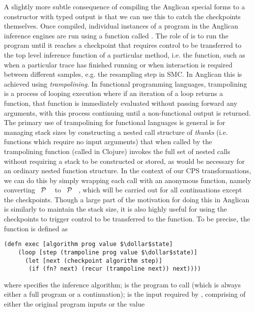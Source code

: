 A slightly more subtle consequence of compiling the Anglican special forms to a constructor with typed output is that
we can use this to catch the checkpoints themselves.  Once compiled, individual instances of
a program in the Anglican inference engines are run using a function called .  The role of
 is to run the program until it reaches a checkpoint that requires control to be transferred
to the top level inference function of a particular method, i.e. the \anginfer function, such as when
a particular trace has finished running or when interaction is required between different samples, e.g. 
the resampling step in SMC.  In Anglican this is achieved using \emph{trampolining}.  In functional
programming languages, trampolining is a process of looping execution where if an iteration of
a loop returns a function, that function is immediately evaluated without passing forward any arguments,
with this process continuing until a non-functional output is returned.  The primary use of trampolining
for functional languages is general 
is for managing stack sizes by constructing a nested call structure of \emph{thunks} (i.e. functions which
require no input arguments) that when called by the trampolining function (called  in Clojure)
invokes the full set of nested calls without requiring a stack to be constructed or stored, as would be necessary
for an ordinary nested function structure.  In the context of our CPS transformations, we can do this by simply
wrapping each call with an anonymous function, namely converting ~$\mathcal{P}$ ~\angstate\clj{)}
to ~$\mathcal{P}$ ~\angstate\clj{))}, which will be carried out for all continuations
except the checkpoints.  Though a large part of the motivation for doing this in
Anglican is similarly to maintain the stack size, it is also highly useful for using the checkpoints to trigger
control to be transferred to the \anginfer function.  To be precise, the  function is defined as
\begin{lstlisting}[basicstyle=\ttfamily\small,frame=none]
  (defn exec [algorithm prog value $\dollar$state]
    (loop [step (trampoline prog value $\dollar$state)]
      (let [next (checkpoint algorithm step)]
       (if (fn? next) (recur (trampoline next)) next))))
\end{lstlisting}\vspace{-8pt}
where  specifies the inference algorithm;  is the program to call (which is always either
a full program or a continuation); 
 is the input required by , comprising of either the original program inputs or the value
